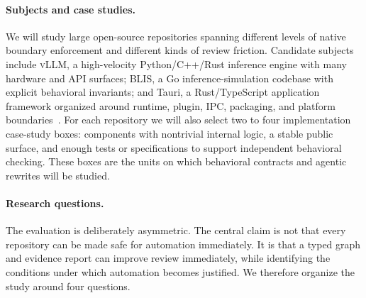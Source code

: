\documentclass[sigconf,review,anonymous]{acmart}
\theoremstyle{plain}
\theoremstyle{definition}
\begin{document}
\paragraph{Subjects and case studies.}
We will study large open-source repositories spanning different levels of native
boundary enforcement and different kinds of review friction. Candidate subjects
include \textsc{vLLM}, a high-velocity Python/C++/Rust inference engine with
many hardware and API surfaces; BLIS, a Go inference-simulation codebase with
explicit behavioral invariants; and Tauri, a Rust/TypeScript application
framework organized around runtime, plugin, IPC, packaging, and platform
boundaries~\cite{vllmrepo,inferencesim,taurirepo,tauriarchitecture}. For each
repository we will also select two to four implementation case-study boxes:
components with nontrivial internal logic, a stable public surface, and enough
tests or specifications to support independent behavioral checking. These boxes
are the units on which behavioral contracts and agentic rewrites will be studied.

\paragraph{Research questions.}
The evaluation is deliberately asymmetric. The central claim is not that every
repository can be made safe for automation immediately. It is that a typed graph
and evidence report can improve review immediately, while identifying the
conditions under which automation becomes justified. We therefore organize the
study around four questions.
\end{document}
